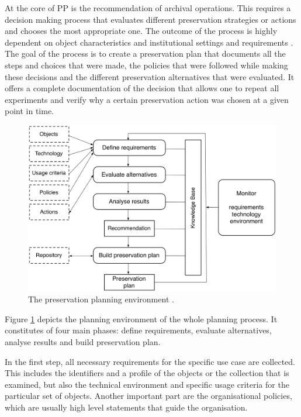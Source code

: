 At the core of PP is the recommendation of archival operations. This requires a decision making process that evaluates different preservation strategies or actions and chooses the most appropriate one. The outcome of the process is highly dependent on object characteristics and institutional settings and requirements \cite{STR07_jcdl}. The goal of the process is to create a preservation plan that documents all the steps and choices that were made, the policies that were followed while making these decisions and the different preservation alternatives that were evaluated. It offers a complete documentation of the decision that allows one to repeat all experiments and verify why a certain preservation action was chosen at a given point in time.

\begin{figure}[th]
\begin{center}
\includegraphics[width=4.5in]{figures/related/planningenvironment.png}
\caption{The preservation planning environment \cite{Becker:2009fk}.}
\label{fig:planenv}
\end{center}
\end{figure}

Figure \ref{fig:planenv} depicts the planning environment of the whole planning process. It constitutes of four main phases: define requirements, evaluate alternatives, analyse results and build preservation plan.

In the first step, all necessary requirements for the specific use case are collected. This includes the identifiers and a profile of the objects or the collection that is examined, but also the technical environment and specific usage criteria for the particular set of objects. Another important part are the organisational policies, which are usually high level statements that guide the organisation.

